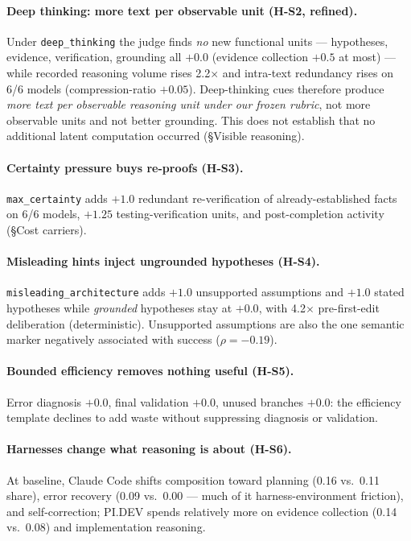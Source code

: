 \documentclass[11pt]{article}
\newcommand{\pidev}{PI.DEV}
\newcommand{\cc}{Claude Code}
\newcommand{\xd}{$\times$}
\begin{document}
\paragraph{Deep thinking: more text per observable unit (H-S2, refined).}
Under \texttt{deep\_thinking} the judge finds \emph{no} new functional
units --- hypotheses, evidence, verification, grounding all $+0.0$
(evidence collection $+0.5$ at most) --- while recorded reasoning volume
rises 2.2\xd{} and intra-text redundancy rises on 6/6 models
(compression-ratio $+0.05$). Deep-thinking cues therefore produce
\emph{more text per observable reasoning unit under our frozen rubric},
not more observable units and not better grounding. This does not
establish that no additional latent computation occurred (\S Visible
reasoning).

\paragraph{Certainty pressure buys re-proofs (H-S3).} \texttt{max\_certainty}
adds $+1.0$ redundant re-verification of already-established facts on 6/6
models, $+1.25$ testing-verification units, and post-completion activity
(\S Cost carriers).

\paragraph{Misleading hints inject ungrounded hypotheses (H-S4).}
\texttt{misleading\_architecture} adds $+1.0$ unsupported assumptions and
$+1.0$ stated hypotheses while \emph{grounded} hypotheses stay at $+0.0$,
with 4.2\xd{} pre-first-edit deliberation (deterministic). Unsupported
assumptions are also the one semantic marker negatively associated with
success ($\rho=-0.19$).

\paragraph{Bounded efficiency removes nothing useful (H-S5).} Error
diagnosis $+0.0$, final validation $+0.0$, unused branches $+0.0$: the
efficiency template declines to add waste without suppressing diagnosis
or validation.

\paragraph{Harnesses change what reasoning is about (H-S6).} At baseline,
\cc{} shifts composition toward planning (0.16 vs.\ 0.11 share),
error recovery (0.09 vs.\ 0.00 --- much of it harness-environment
friction), and self-correction; \pidev{} spends relatively more on
evidence collection (0.14 vs.\ 0.08) and implementation reasoning.
\end{document}
